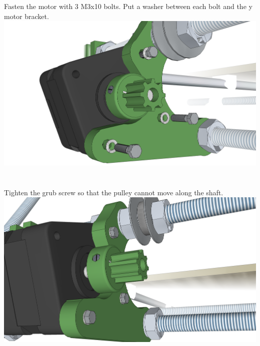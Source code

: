 \documentclass[twoside,a4paper,titlepage]{memoir}
\begin{document}
	\section{}
	Fasten the motor with 3 M3x10 bolts. Put a washer between each bolt and the y motor bracket.\\
	\includegraphics[width=1\linewidth]{graphics/ch6_18.png}
	
	\section{}
	Tighten the grub screw so that the pulley cannot move along the shaft.\\
	\includegraphics[width=1\linewidth]{graphics/ch6_19.png}
	
\end{document}
